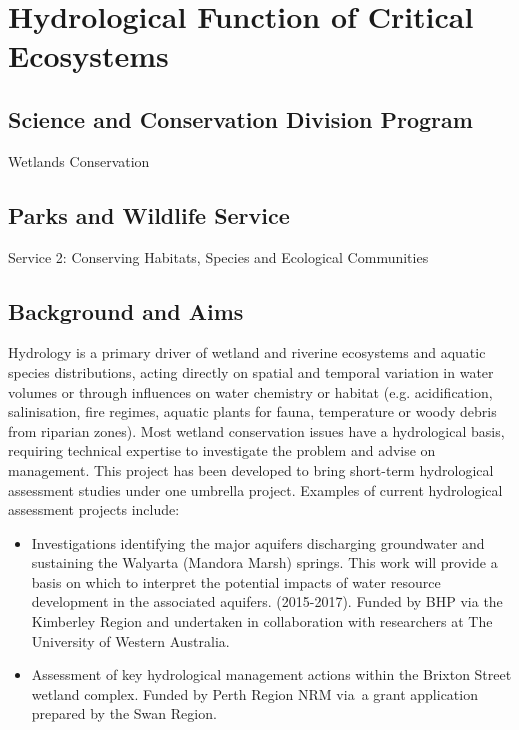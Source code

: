 \documentclass[version=last, 
    paper=a4, %
    10pt, %
    usenames,
    dvipsnames, 
    oneside, %
    headings=openany, %
    DIV=15 %
]{scrbook}
\begin{document}
\section*{Hydrological Function of Critical Ecosystems
}


\subsection*{Science and Conservation Division Program}
Wetlands Conservation



\subsection*{Parks and Wildlife Service}
Service 2: Conserving Habitats, Species and Ecological Communities



\subsection*{Background and Aims}
Hydrology is a primary driver of wetland and riverine ecosystems and
aquatic species distributions, acting directly on spatial and temporal
variation in water volumes or through influences on water chemistry or
habitat (e.g. acidification, salinisation, fire regimes, aquatic plants
for fauna, temperature or woody debris from riparian zones). Most
wetland conservation issues have a hydrological basis, requiring
technical expertise to investigate the problem and advise on management.
This project has been developed to bring short-term hydrological
assessment studies under one umbrella project. Examples of current
hydrological assessment projects include:

\begin{itemize}
\itemsep1pt\parskip0pt
\item
  Investigations identifying the major aquifers discharging groundwater
  and sustaining the Walyarta (Mandora Marsh) springs. This work will
  provide a basis on which to interpret the potential impacts of water
  resource development in the associated aquifers. (2015-2017). Funded
  by BHP via the Kimberley Region and undertaken in collaboration with
  researchers at The University of Western Australia.
\end{itemize}

\begin{itemize}
\itemsep1pt\parskip0pt
\item
  Assessment of key hydrological management actions within the Brixton
  Street wetland complex. Funded by Perth Region NRM via~a grant
  application prepared by the Swan Region.
\end{itemize}
\end{document}
